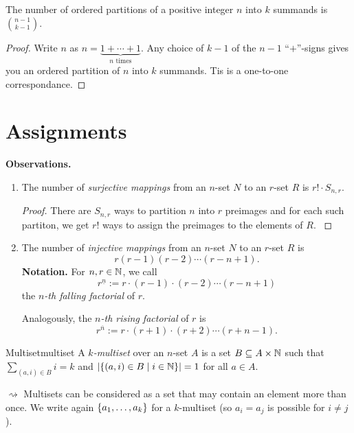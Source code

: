 \documentclass[language=english]{../../Template/TemplateLecture}
\begin{document}
\begin{prop}
    The number of ordered partitions of a positive integer $n$ into $k$ summands is $\binom{n-1}{k-1}$.
\end{prop}

\begin{proof}
    Write $n$ as $n = \underset{\text{$n$ times}}{\underbrace{1 + \cdots + 1}}$. Any choice of $k-1$ of the $n-1$ \enquote{$+$}-signs gives you an ordered partition of $n$ into $k$ summands. Tis is a one-to-one correspondance.
\end{proof}

\section{Assignments}

\textbf{Observations.}
\begin{enumerate}[$(i)$]
    \item The number of \emph{surjective mappings} from an $n$-set $N$ to an $r$-set $R$ is $r! \cdot S_{n,r}$.
    \begin{proof}
        There are $S_{n,r}$ ways to partition $n$ into $r$ preimages and for each such partiton, we get $r!$ ways to assign the preimages to the elements of $R$. \label{observationSnr}
    \end{proof}
    \item The number of \emph{injective mappings} from an $n$-set $N$ to an $r$-set $R$ is 
    \begin{equation}
        r(r-1)(r-2)\cdots(r-n+1).
    \end{equation}
    \textbf{Notation.} For $n, r \in \mathbb{N}$, we call 
    \begin{equation}
        r^{\underline{n}} := r \cdot (r-1) \cdot (r-2) \cdots (r-n+1)
    \end{equation}
    the \emph{$n$-th falling factorial} of $r$.

    Analogously, the \emph{$n$-th rising factorial} of $r$ is 
    \begin{equation}
        r^{\overline{n}} := r \cdot (r+1) \cdot (r+2) \cdots (r+n-1).
    \end{equation}
\end{enumerate}

\begin{defi}{Multiset}{multiset}
    A \emph{$k$-multiset} over an $n$-set $A$ is a set $B \subseteq A \times \mathbb{N}$ such that $\sum_{(a,i) \in B} i = k$ and $\lvert\{(a,i) \in B \mid i \in \mathbb{N}\}\rvert = 1$ for all $a \in A$.
\end{defi}
$\rightsquigarrow$ Multisets can be considered as a set that may contain an element more than once. We write again $\{a_1, \ldots, a_k\}$ for a $k$-multiset (so $a_i = a_j$ is possible for $i \neq j$).
\end{document}
